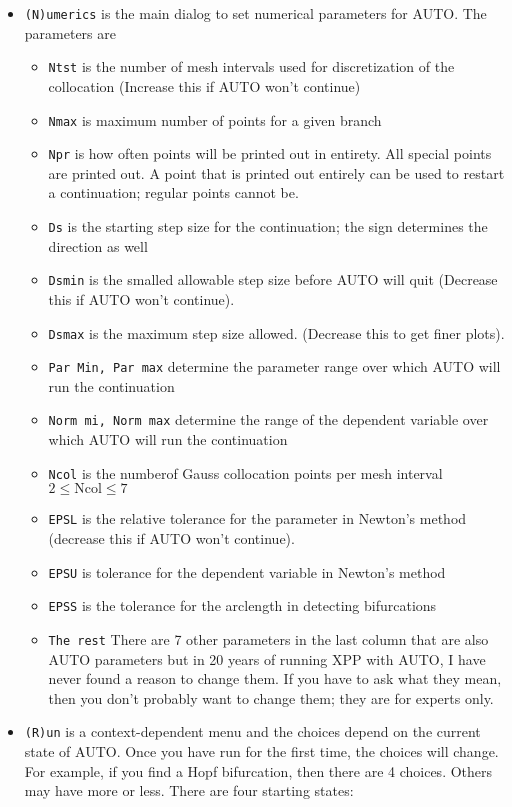 \documentclass{article}
\begin{document}
\begin{itemize}
\begin{itemize}
\end{itemize}   
\item {\tt (N)umerics} is the main dialog to set numerical parameters for AUTO. The parameters are 
\begin{itemize}
\item {\tt Ntst} is the number of mesh intervals used for discretization of the collocation (Increase this if AUTO won't continue)
\item {\tt Nmax} is maximum number of points for a given branch
\item {\tt Npr} is how often points will be printed out in entirety. All special points are printed out. A point that is printed out entirely can be used to restart a continuation; regular points cannot be. 
\item{\tt Ds} is the starting step size for the continuation; the sign determines the direction as well
\item{\tt Dsmin} is the smalled allowable step size before AUTO will quit (Decrease this if AUTO won't continue).
\item{\tt Dsmax} is the maximum step size allowed. (Decrease this to get finer plots).
\item {\tt Par Min, Par max} determine the parameter range over which AUTO will run the continuation
\item {\tt Norm mi, Norm max} determine the range of the dependent variable over which AUTO will run the continuation 
\item {\tt Ncol} is the numberof Gauss collocation points per mesh interval $2\le \mbox{Ncol} \le 7$
\item {\tt EPSL} is the relative tolerance for the parameter in Newton's method (decrease this if AUTO won't continue).
\item {\tt EPSU} is tolerance for the dependent variable in Newton's method
\item{\tt EPSS} is the tolerance for the arclength in detecting bifurcations
\item{\tt The rest}  There are 7 other parameters in the last column that are also AUTO parameters but in 20 years of running XPP with AUTO, I have never found a reason to change them. If you have to ask what they mean, then you don't probably want to change them; they are for experts only.
\end{itemize}
\item {\tt (R)un} is a context-dependent menu and the choices depend on the current state of AUTO. Once you have run for the first time, the choices will change. For example, if you find a Hopf bifurcation, then there are 4 choices. Others may have more or less. There are four starting states:

\end{itemize}
\end{document}
